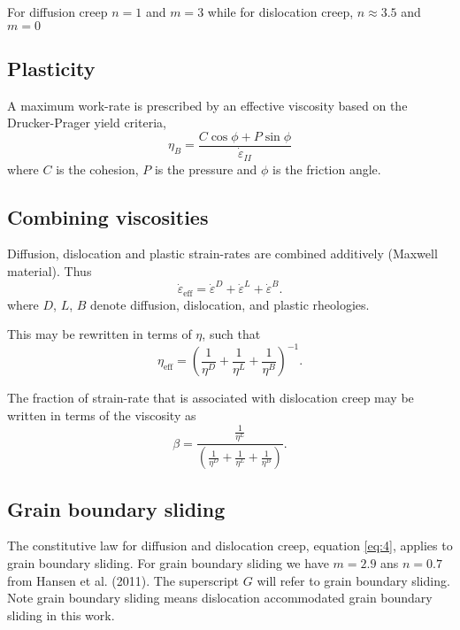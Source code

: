 \documentclass[a4paper]{article}
\newcommand{\strr}{\dot{\varepsilon}}
\begin{document}
For diffusion creep $n=1$ and $m=3$ while for dislocation creep,
$n\approx3.5$ and $m=0$

\subsection{Plasticity}

A maximum work-rate is prescribed by an effective viscosity based on
the Drucker-Prager yield criteria,
\begin{equation}
  \eta_{B} = \frac{C \cos \phi + P \sin \phi}{\strr_{II}}
\end{equation}
where $C$ is the cohesion, $P$ is the pressure and $\phi$ is the friction angle.

\subsection{Combining viscosities}

Diffusion, dislocation and plastic strain-rates are combined
additively (Maxwell material).  Thus
\begin{equation}
  \strr_\text{eff} = \strr^D + \strr^L + \strr^B.
\end{equation}
where $D$, $L$, $B$ denote diffusion, dislocation, and plastic
rheologies.

This may be rewritten in terms of $\eta$, such that
\begin{equation}
  \eta_\text{eff} = \left( \frac{1}{\eta^D} + \frac{1}{\eta^L} + \frac{1}{\eta^B} \right)^{-1}.
\end{equation}

The fraction of strain-rate that is associated with dislocation creep may be written in terms of the viscosity as
\begin{equation}
  \beta = \frac{\frac{1}{\eta^L}}{\left( \frac{1}{\eta^D} + \frac{1}{\eta^L} + \frac{1}{\eta^B} \right)}.
  \label{eq:beta1}
\end{equation}

\subsection{Grain boundary sliding}

The constitutive law for diffusion and dislocation creep, equation \ref{eq:4}, applies to grain boundary sliding.
For grain boundary sliding we have $m =2.9$ ans $n=0.7$ from Hansen et al. (2011).
The superscript $G$ will refer to grain boundary sliding.
Note grain boundary sliding means dislocation accommodated grain boundary sliding in this work.
\end{document}
